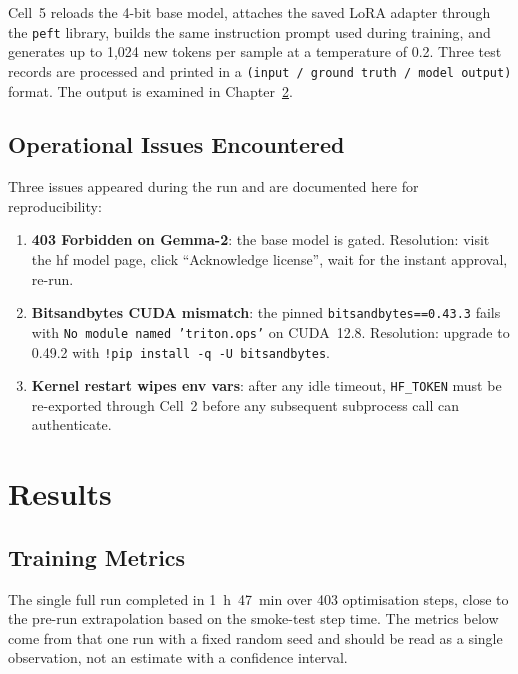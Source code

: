 \documentclass[12pt, a4paper]{report}
\begin{document}
Cell~5 reloads the 4-bit base model, attaches the saved LoRA adapter
through the \texttt{peft} library, builds the same instruction prompt
used during training, and generates up to 1{,}024 new tokens per sample
at a temperature of 0.2. Three test records are processed and printed in
a \texttt{(input / ground truth / model output)} format. The output is
examined in Chapter~\ref{ch:results}.

\section{Operational Issues Encountered}

Three issues appeared during the run and are documented here for
reproducibility:

\begin{enumerate}
  \item \textbf{403 Forbidden on Gemma-2}: the base model is gated.
        Resolution: visit the \gls{hf} model page, click
        ``Acknowledge license'', wait for the instant approval, re-run.
  \item \textbf{Bitsandbytes CUDA mismatch}: the pinned
        \texttt{bitsandbytes==0.43.3} fails with
        \texttt{No module named 'triton.ops'} on CUDA~12.8. Resolution:
        upgrade to 0.49.2 with \texttt{!pip install -q -U bitsandbytes}.
  \item \textbf{Kernel restart wipes env vars}: after any idle timeout,
        \texttt{HF\_TOKEN} must be re-exported through Cell~2 before any
        subsequent subprocess call can authenticate.
\end{enumerate}

\chapter{Results}
\label{ch:results}

\section{Training Metrics}

The single full run completed in 1~h~47~min over 403 optimisation steps,
close to the pre-run extrapolation based on the smoke-test step time.
The metrics below come from that one run with a fixed random seed and
should be read as a single observation, not an estimate with a confidence
interval.
\end{document}
